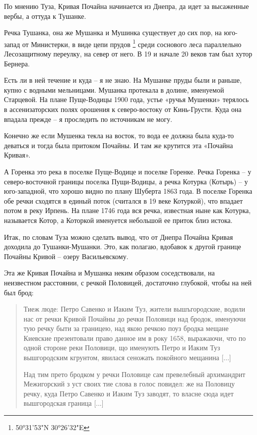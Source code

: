 По мнению Туза, Кривая Почайна начинается из Днепра, да идет за высаженные вербы, а оттуда к Тушанке.

Речка Тушанка, она же Мушанка и Мушинка существует до сих пор, на юго-запад от Министерки, в виде цепи прудов \footnote{50°31'53"N 30°26'32"E} среди соснового леса параллельно Лесозащитному переулку, на север от него. В 19 и начале 20 веков там был хутор Бернера.

Есть ли в ней течение и куда – я не знаю. На Мушанке пруды были и раньше, купно с водными мельницами. Мушанка протекала в долине, именуемой Старцевой. На плане Пуще-Водицы 1900 года, устье «ручья Мушенки» терялось в ассенизаторских полях орошения к северо-востоку от Кинь-Грусти. Куда она впадала прежде – я проследить по источникам не могу.

Конечно же если Мушенка текла на восток, то вода ее должна была куда-то деваться и тогда была притоком Почайны. И там же крутится эта «Почайна Кривая».

А Горенка это река в поселке Пуще-Водице и поселке Горенке. Речка Горенка – у северо-восточной границы поселка Пущи-Водицы, а речка Котурка (Котырь) – у юго-западной, что хорошо видно по плану Шуберта 1863 года. В поселке Горенка обе речки сходятся в единый поток (считался в 19 веке Котуркой), что впадает потом в реку Ирпень. На плане 1746 года вся речка, известная ныне как Котурка, называется Котор, а Которкой именуется небольшой ее приток близ истока.

Итак, по словам Туза можно сделать вывод, что от Днепра Почайна Кривая доходила до Тушанки-Мушанки. Это, как полагаю, вдобавок к другой границе Почайны Кривой – озеру Васильевскому.

Эта же Кривая Почайна и Мушанка неким образом соседствовали, на неизвестном расстоянии, с речкой Половицей, достаточно глубокой, чтобы на ней был брод:

\begin{quotation}
Тиеж люде: Петро Савенко и Иаким Туз, жители вышъгородские, водили нас от речки Кривой Почайны до речки Половици над бродок, именуючи тую речку быти за границею, над якою речкою поуз бродка мещане Киевские презентовали право данное им в року 1658, выражаючи, что по одной стороне реки Половици, що именують Петро и Иаким Туз вышгородским кгрунтом, явилася сеножать покойного мещанина [...]

Над тим прето бродком у речки Половице сам превелебный архимандрит Межигорский з уст своих тие слова в голос повидел: же на Половицу речку, куда Петро Савенко и Иаким Туз заводят, то власне сюда идет вышгородская граница [...]
\end{quotation}

